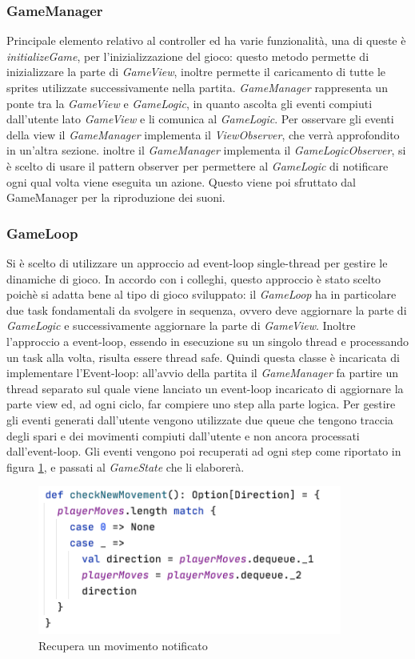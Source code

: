
\subsubsection{GameManager} Principale elemento relativo al controller ed ha varie funzionalità, una di queste è \textit{initializeGame}, per l'inizializzazione del gioco: questo metodo permette di inizializzare la parte di \textit{GameView}, inoltre permette il caricamento di tutte le sprites utilizzate successivamente nella partita.
    \textit{GameManager} rappresenta un ponte tra la \textit{GameView} e \textit{GameLogic}, in quanto ascolta gli eventi compiuti dall'utente lato \textit{GameView} e li comunica al \textit{GameLogic}. 
    Per osservare gli eventi della view il \textit{GameManager} implementa il \textit{ViewObserver}, che verrà approfondito in un'altra sezione.
    inoltre il \textit{GameManager} implementa il \textit{GameLogicObserver}, si è scelto di usare il pattern observer per permettere al \textit{GameLogic} di notificare ogni qual volta viene eseguita un azione. Questo viene poi sfruttato dal GameManager per la riproduzione dei suoni.
    
    \subsubsection{GameLoop} Si è scelto di utilizzare un approccio ad event-loop single-thread per gestire le dinamiche di gioco. In accordo con i colleghi, questo approccio è stato scelto poichè si adatta bene al tipo di gioco sviluppato: il \textit{GameLoop} ha in particolare due task fondamentali da svolgere in sequenza, ovvero deve aggiornare la parte di \textit{GameLogic} e successivamente aggiornare la parte di \textit{GameView}. Inoltre l'approccio a event-loop, essendo in esecuzione su un singolo thread e processando un task alla volta, risulta essere thread safe.
    Quindi questa classe è incaricata di implementare l'Event-loop: all'avvio della partita il \textit{GameManager} fa partire un thread separato sul quale viene lanciato un event-loop incaricato di aggiornare la parte view ed, ad ogni ciclo, far compiere uno step alla parte logica.
    Per gestire gli eventi generati dall'utente vengono utilizzate due queue che tengono traccia degli spari e dei movimenti compiuti dall'utente e non ancora processati dall'event-loop. Gli eventi vengono poi recuperati ad ogni step come riportato in figura \ref{checknewMovement}, e passati al \textit{GameState} che li elaborerà. 
    
    \begin{figure}[H]
    \centering
      \includegraphics[width=10cm]{res/checkNewMovement.png}
      \caption{Recupera un movimento notificato}
      \label{checknewMovement}
    \end{figure}
    
